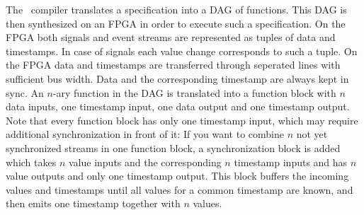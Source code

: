 The \tessla\ compiler translates a specification into a DAG of functions.
This DAG is then synthesized on an FPGA in order to execute such a specification.
On the FPGA both signals and event streams are represented
as tuples of data and timestamps.
In case of signals each value change corresponds to such a tuple.
On the FPGA data and timestamps are transferred through seperated lines
with sufficient bus width.
Data and the corresponding timestamp are always kept in sync.
An $n$-ary function in the DAG is translated into a function block with $n$ data inputs,
one timestamp input, one data output and one timestamp output.
Note that every function block has only one timestamp input,
which may require additional synchronization in front of it:
If you want to combine $n$ not yet synchronized streams in one function block,
a synchronization block is added which takes $n$ value inputs and the corresponding $n$ timestamp inputs
and has $n$ value outputs and only one timestamp output.
This block buffers the incoming values and timestamps until all values for a common timestamp are known,
and then emits one timestamp together with $n$ values.

